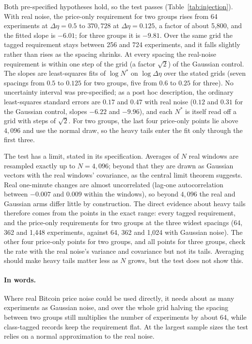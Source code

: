 \documentclass[12pt]{article}
\theoremstyle{definition}
\theoremstyle{remark}
\begin{document}
Both pre-specified hypotheses hold, so the test passes (Table~\ref{tab:injection}). With real noise, the price-only requirement for two groups rises from 64 experiments at $\Delta\eta=0.5$ to $370{,}728$ at $\Delta\eta=0.125$, a factor of about 5{,}800, and the fitted slope is $-6.01$; for three groups it is $-9.81$. Over the same grid the tagged requirement stays between 256 and 724 experiments, and it falls slightly rather than rises as the spacing shrinks. At every spacing the real-noise requirement is within one step of the grid (a factor $\sqrt2$) of the Gaussian control. The slopes are least-squares fits of $\log N^*$ on $\log\Delta\eta$ over the stated grids (seven spacings from $0.5$ to $0.125$ for two groups, five from $0.6$ to $0.25$ for three). No uncertainty interval was pre-specified; as a post hoc description, the ordinary least-squares standard errors are $0.17$ and $0.47$ with real noise ($0.12$ and $0.31$ for the Gaussian control, slopes $-6.22$ and $-9.96$), and each $N^*$ is itself read off a grid with steps of $\sqrt2$. For two groups, the last four price-only points lie above $4{,}096$ and use the normal draw, so the heavy tails enter the fit only through the first three.

The test has a limit, stated in its specification. Averages of $N$ real windows are resampled exactly up to $N=4{,}096$; beyond that they are drawn as Gaussian vectors with the real windows' covariance, as the central limit theorem suggests. Real one-minute changes are almost uncorrelated (lag-one autocorrelation between $-0.007$ and $0.009$ within the windows), so beyond $4{,}096$ the real and Gaussian arms differ little by construction. The direct evidence about heavy tails therefore comes from the points in the exact range: every tagged requirement, and the price-only requirements for two groups at the three widest spacings (64, 362 and 1{,}448 experiments, against 64, 362 and 1{,}024 with Gaussian noise). The other four price-only points for two groups, and all points for three groups, check the rate with the real noise's variance and covariance but not its tails. Averaging should make heavy tails matter less as $N$ grows, but the test does not show this.

\paragraph{In words.} Where real Bitcoin price noise could be used directly, it needs about as many experiments as Gaussian noise, and over the whole grid halving the spacing between two groups still multiplies the number of experiments by about 64, while class-tagged records keep the requirement flat. At the largest sample sizes the test relies on a normal approximation to the real noise.
\end{document}
